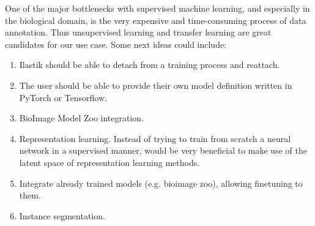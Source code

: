 \documentclass[12pt, a4paper]{article}
\begin{document}
One of the major bottlenecks with supervised machine learning, and especially in the biological domain, is the very expensive and time-consuming process of data annotation. Thus unsupervised learning and transfer learning are great candidates for our use case. Some next ideas could include:

\begin{enumerate}
    \item Ilastik should be able to detach from a training process and reattach.
    \item The user should be able to provide their own model definition written in PyTorch or Tensorflow.
    \item BioImage Model Zoo integration.
    \item Representation learning. Instead of trying to train from scratch a neural network in a supervised manner, would be very beneficial to make use of the latent space of representation learning methods.
    \item Integrate already trained models (e.g. bioimage zoo), allowing finetuning to them.
    \item Instance segmentation.
\end{enumerate}

\clearpage



\end{document}

